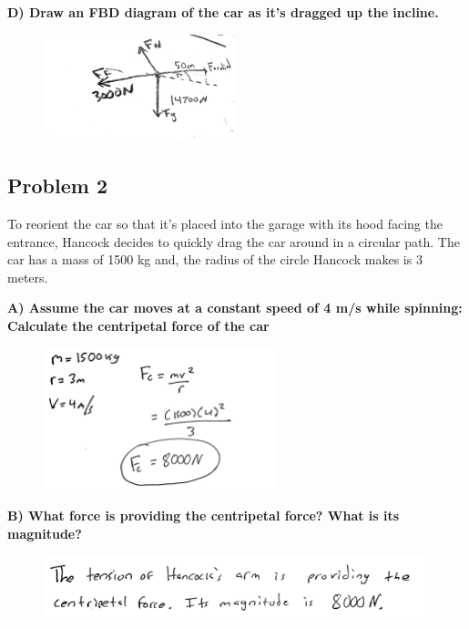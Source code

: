 \documentclass[a4paper,12pt]{article}
\begin{document}
\noindent\textbf{D) Draw an FBD diagram of the car as it's dragged up the incline.} \\


\begin{figure}[H]
    \centering
    \includegraphics[width=0.5\textwidth]{U3_P1_F} %
\end{figure} 

\newpage 

\subsection{Problem 2}

To reorient the car so that it's placed into the garage with its hood facing the entrance, Hancock decides to quickly drag the car around in a circular path. The car has a mass of 1500 kg and, the radius of the circle Hancock makes is 3 meters. 


\noindent\textbf{A) Assume the car moves at a constant speed of 4 m/s while spinning: Calculate the centripetal force of the car} \\


\begin{figure}[H]
    \centering
    \includegraphics[width=0.6\textwidth]{U3_P2_A.jpg} %
\end{figure} 

\noindent\textbf{B) What force is providing the centripetal force? What is its magnitude?} \\

\begin{figure}[H]
    \centering
    \includegraphics[width=1\textwidth]{U3_P2_B.jpg} %
\end{figure} 
\end{document}
